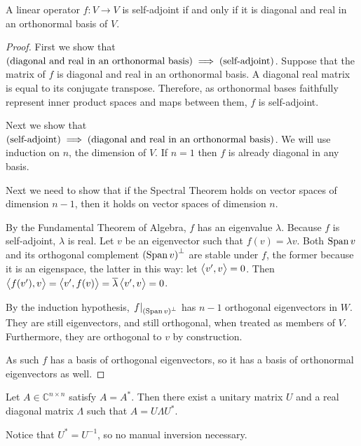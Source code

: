 \begin{theorem}
A linear operator \(f: V\to V\) is self-adjoint if and only if it is diagonal and real in an orthonormal basis of \(V\).
\end{theorem}
\begin{proof}
First we show that
\(\del{\text{diagonal and real in an orthonormal basis}}\implies\del{\text{self-adjoint}}\).
Suppose that the matrix of \(f\) is diagonal and real in an orthonormal basis.
A diagonal real matrix is equal to its conjugate transpose.
Therefore, as orthonormal bases faithfully represent inner product spaces and maps between them, \(f\) is self-adjoint.

Next we show that
\(\del{\text{self-adjoint}}\implies\del{\text{diagonal and real in an orthonormal basis}}\).
We will use induction on \(n\), the dimension of \(V\).
If \(n = 1\) then \(f\) is already diagonal in any basis.

Next we need to show that if the Spectral Theorem holds on vector spaces of dimension \(n- 1\), then it holds on vector spaces of dimension \(n\).

By the Fundamental Theorem of Algebra, \(f\) has an eigenvalue \(\lambda\).
Because \(f\) is self-adjoint, \(\lambda\) is real.
Let \(v\) be an eigenvector such that \(f(v) = \lambda v\).
Both \(\operatorname{\mathrm{Span}}{v}\) and its orthogonal complement \(\del{\Span{v}}^\perp\)
are stable under \(f\), the former because it is an eigenspace, the latter in this way: let \(\left\langle v', v\right\rangle = 0\).
Then \(\left\langle f(v'), v\right\rangle = \left\langle v', f(v)\right\rangle = \overline{\lambda}\left\langle v', v\right\rangle=0\).

By the induction hypothesis, \(\left.f\right|_{\del{\Span{v}}^\perp}\)
has \(n-1\) orthogonal eigenvectors in \(W\).
They are still eigenvectors, and still orthogonal, when treated as members of \(V\).
Furthermore, they are orthogonal to \(v\) by construction.

As such \(f\) has a basis of orthogonal eigenvectors, so it has a basis of orthonormal eigenvectors as well.
\end{proof}

\begin{lemma}
  Let \(A \in \mathbb{C}^{n\times n}\) satisfy \(A = A^*\).
  Then there exist a unitary matrix \(U\) and a real diagonal matrix \(\Lambda\)
  such that \(A = U\Lambda U^*\).
\end{lemma}
Notice that \(U^* = U^{-1}\), so no manual inversion necessary.

